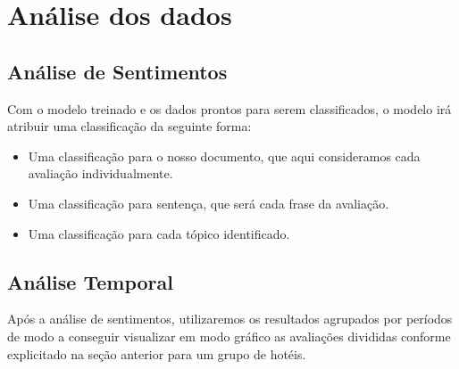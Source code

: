 \section{Análise dos dados}

\subsection{Análise de Sentimentos}
\label{subsec:analise_sentimentos}

Com o modelo treinado e os dados prontos para serem classificados, o modelo irá atribuir uma classificação da seguinte forma:
\begin{itemize}
    \item Uma classificação para o nosso documento, que aqui consideramos cada avaliação individualmente.
    \item Uma classificação para sentença, que será cada frase da  avaliação.
    \item Uma classificação para cada tópico identificado.
\end{itemize}

\subsection{Análise Temporal}
\label{subsec:analise_temporal}
Após a análise de sentimentos, utilizaremos os resultados agrupados por períodos de modo a conseguir visualizar em modo gráfico as avaliações divididas conforme explicitado na seção anterior para um grupo de hotéis.
